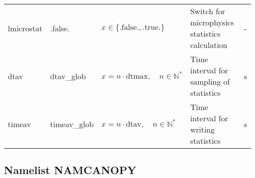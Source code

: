 \documentclass[twoside,11pt,fleqn,a4paper,english,openright]{report}
\begin{document}
\begin{center}
  \tablelasttail{
        &&&&\\\hline
  }
\begin{supertabular}{|l|p{2cm}|p{4cm}|p{6cm}|l|}
  lmicrostat	& .false.	& $x\in\{\text{.false.},\text{.true.}\}$	& Switch for microphysics statistics calculation	& -\\
  dtav		& dtav\_glob	& $x = n \cdot \text{dtmax}, \quad n \in \mathbb{N}^*$	& Time interval for sampling of statistics	& s\\
  timeav	& timeav\_glob	& $x = n \cdot \text{dtav}, \quad n \in \mathbb{N}^*$	& Time interval for writing statistics		& s\\
\end{supertabular}
\end{center}

\subsection{Namelist NAMCANOPY}\label{par:canopy}
\end{document}
